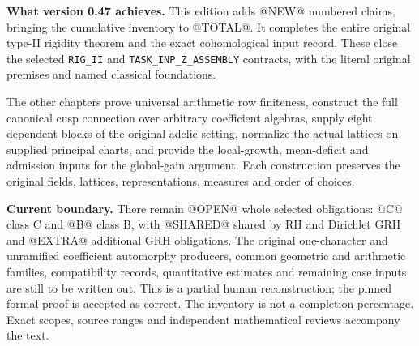\textbf{What version 0.47 achieves.}
This edition adds @NEW@ numbered claims, bringing the cumulative inventory
to @TOTAL@. It completes the entire original type-II rigidity theorem
and the exact cohomological input record. These close the selected
\texttt{RIG\_II} and \texttt{TASK\_INP\_Z\_ASSEMBLY} contracts,
with the literal original premises and named classical foundations.

The other chapters prove universal arithmetic row finiteness, construct
the full canonical cusp connection over arbitrary coefficient algebras,
supply eight dependent blocks of the original adelic setting, normalize
the actual lattices on supplied principal charts, and provide the
local-growth, mean-deficit and admission inputs for the global-gain
argument. Each construction preserves the original fields, lattices,
representations, measures and order of choices.

\textbf{Current boundary.}
There remain @OPEN@ whole selected obligations: @C@ class C and @B@
class B, with @SHARED@ shared by RH and Dirichlet GRH and @EXTRA@
additional GRH obligations. The original one-character and unramified
coefficient automorphy producers, common geometric and arithmetic
families, compatibility records, quantitative estimates and remaining
case inputs are still to be written out. This is a partial human
reconstruction; the pinned formal proof is accepted as correct.
The inventory is not a completion percentage. Exact scopes, source
ranges and independent mathematical reviews accompany the text.

